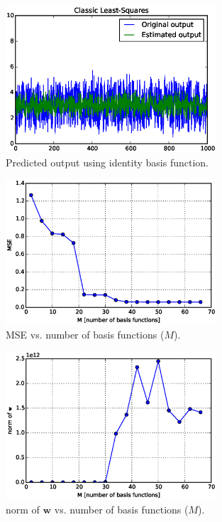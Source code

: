 \documentclass[a4paper,12pt]{article}
\newcommand{\mb}[1]{\ensuremath{\mathbf{#1}}}
\begin{document}
\begin{figure}[htb]
 \centering
 \includegraphics[width=0.7\textwidth]{./figures/6f1.eps}
 \caption{Predicted output using identity basis function.}
 \label{fig:6f1}
\end{figure}
\begin{figure}[htb]
 \centering
 \includegraphics[width=0.7\textwidth]{./figures/6f2.eps}
 \caption{MSE vs. number of basis functions ($M$).}
 \label{fig:6f2}
\end{figure}
\begin{figure}[htb]
 \centering
 \includegraphics[width=0.7\textwidth]{./figures/6f3.eps}
 \caption{norm of $\mb{w}$ vs. number of basis functions ($M$).}
 \label{fig:6f3}
\end{figure}
\end{document}
